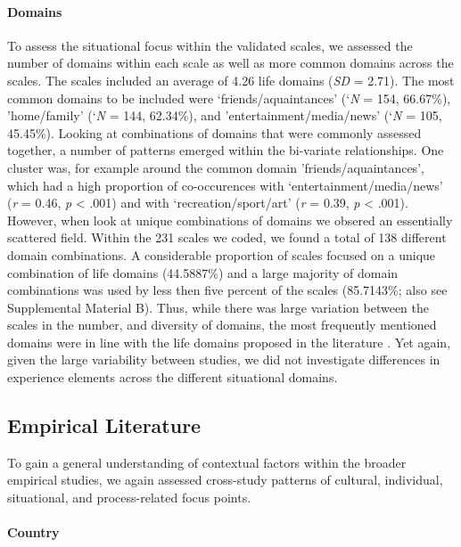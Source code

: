 \paragraph{Domains}

To assess the situational focus within the validated scales, we assessed
the number of domains within each scale as well as more common domains
across the scales. The scales included an average of 4.26 life domains
(\textit{SD} = 2.71). The most common domains to be included were
`friends/aquaintances' (`\textit{N} = 154, 66.67\%), 'home/family'
(`\textit{N} = 144, 62.34\%), and 'entertainment/media/news'
(`\textit{N} = 105, 45.45\%). Looking at combinations of domains that
were commonly assessed together, a number of patterns emerged within the
bi-variate relationships. One cluster was, for example around the common
domain 'friends/aquaintances', which had a high proportion of
co-occurences with `entertainment/media/news' (\textit{r} = 0.46,
\textit{p} \textless{} .001) and with `recreation/sport/art' (\textit{r}
= 0.39, \textit{p} \textless{} .001). However, when look at unique
combinations of domains we obsered an essentially scattered field.
Within the 231 scales we coded, we found a total of 138 different domain
combinations. A considerable proportion of scales focused on a unique
combination of life domains (44.5887\%) and a large majority of domain
combinations was used by less then five percent of the scales
(85.7143\%; also see Supplemental Material B). Thus, while there was
large variation between the scales in the number, and diversity of
domains, the most frequently mentioned domains were in line with the
life domains proposed in the literature
\citep[e.g.,][]{Arends-Toth2007}. Yet again, given the large variability
between studies, we did not investigate differences in experience
elements across the different situational domains.

\subsection{Empirical Literature}

To gain a general understanding of contextual factors within the broader
empirical studies, we again assessed cross-study patterns of cultural,
individual, situational, and process-related focus points.

\paragraph{Country}

